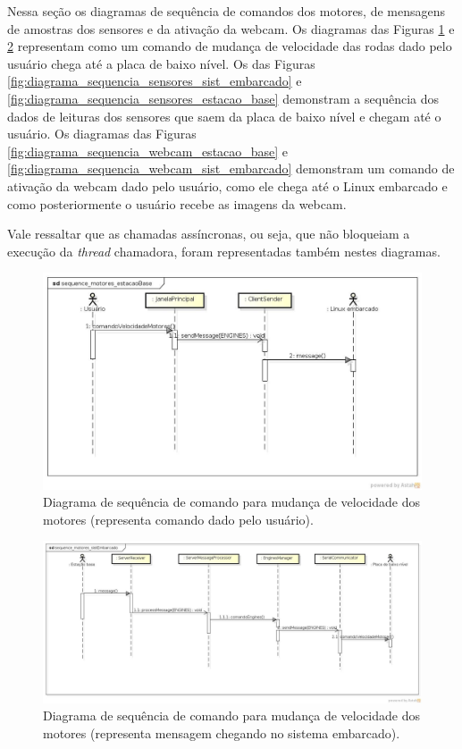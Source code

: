 Nessa seção os diagramas de sequência de comandos dos motores, de mensagens de amostras dos sensores e da ativação da webcam. Os diagramas das Figuras \ref{fig:diagrama_sequencia_motores_estacao_base} e \ref{fig:diagrama_sequencia_motores_sist_embarcado} representam como um comando de mudança de velocidade das rodas dado pelo usuário chega até a placa de baixo nível. Os das Figuras \ref{fig:diagrama_sequencia_sensores_sist_embarcado} e \ref{fig:diagrama_sequencia_sensores_estacao_base} demonstram a sequência dos dados de leituras dos sensores que saem da placa de baixo nível e chegam até o usuário.  Os diagramas das Figuras \ref{fig:diagrama_sequencia_webcam_estacao_base} e \ref{fig:diagrama_sequencia_webcam_sist_embarcado} demonstram um comando de ativação da webcam dado pelo usuário, como ele chega até o Linux embarcado e como posteriormente o usuário recebe as imagens da webcam.

Vale ressaltar que as chamadas assíncronas, ou seja, que não bloqueiam a execução da \textit{thread} chamadora, foram representadas também nestes diagramas.

\begin{figure}[H]
  \centering
  \includegraphics[width=\textwidth, keepaspectratio]{./figuras/estacaoBase/sequence_motores_estacaoBase.jpg}
  \caption{Diagrama de sequência de comando para mudança de velocidade dos motores (representa comando dado pelo usuário).}
  \label{fig:diagrama_sequencia_motores_estacao_base}
\end{figure}

\begin{figure}[H]
  \centering
  \includegraphics[width=\textwidth, keepaspectratio]{./figuras/sistEmbarcado/sequence_motores_sistEmbarcado.jpg}
  \caption{Diagrama de sequência de comando para mudança de velocidade dos motores (representa mensagem chegando no sistema embarcado).}
  \label{fig:diagrama_sequencia_motores_sist_embarcado}
\end{figure}

